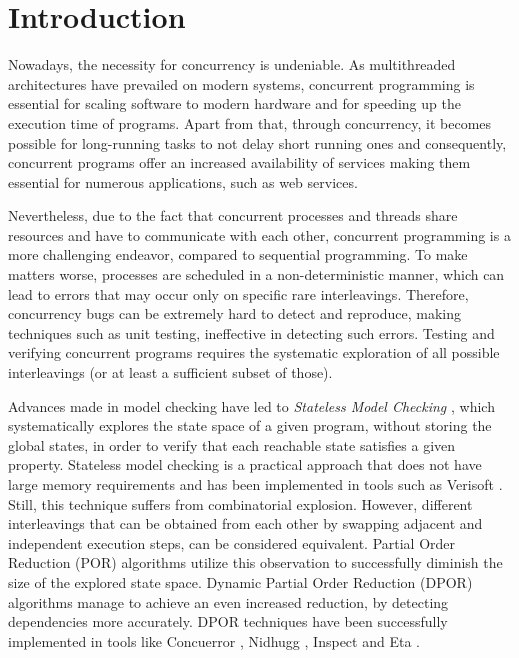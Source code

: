  \chapter{Introduction}

Nowadays, the necessity for concurrency is undeniable. 
As multithreaded architectures have prevailed on modern systems, concurrent 
programming is essential for scaling software to modern hardware and for speeding up the execution time of programs. Apart from that, through concurrency, it becomes possible for 
long-running tasks to not delay short running ones and consequently, concurrent programs offer an increased availability 
of services making them essential for numerous applications, such as web services. 

Nevertheless, due to the fact that concurrent processes and threads share resources and have to communicate with each other,
concurrent programming is a more challenging endeavor, compared to sequential programming. To make matters worse, 
processes are scheduled in a non-deterministic manner, which can lead to errors that may occur only on specific 
rare interleavings. Therefore, concurrency bugs can be extremely hard to detect and reproduce, making techniques such as
unit testing, ineffective in detecting such errors. Testing and verifying concurrent programs requires the systematic exploration
of all possible interleavings (or at least a sufficient subset of those).

Advances made in model checking have led to \textit{Stateless Model Checking} \cite{Godefroid:1997:MCP:263699.263717}, 
which systematically explores the state space of a given program, without storing the global states, in order to verify
that each reachable state satisfies a given property.
Stateless model checking is a practical approach that does not have large memory requirements and has been implemented in
tools such as Verisoft \cite{Godefroid:2005:SMC:1084665.1084674}.
Still, this technique suffers from combinatorial explosion. However, different interleavings that can be obtained from each other by
swapping adjacent and independent execution steps, can be considered equivalent.
Partial Order Reduction (POR) \cite{Godefroid1996, POR, 10.1007/3-540-53863-1_36} algorithms utilize this observation to successfully diminish
the size of the explored state space. Dynamic Partial Order Reduction 
(DPOR) \cite{FlanaganDPOR, AbdullaAronisJohnssonSagonasDPOR2014} algorithms manage to achieve an even increased reduction,
by detecting dependencies more accurately. DPOR techniques have been successfully implemented in tools like Concuerror 
\cite{6569727, Gotovos:2011:TDC:2034654.2034664}, Nidhugg \cite{Abdulla:2015:SMC:2945565.2945622}, Inspect \cite{Yang:2007:DDP:1770532.1770541}
and Eta \cite{simsa2011efficient}.

